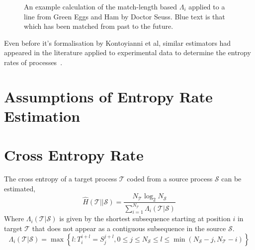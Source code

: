 \begin{figure}[hb]
	\caption{An example calculation of the match-length based $\Lambda_i$ applied to a line from Green Eggs and Ham by Doctor Seuss. {\color{blue} Blue text} is that which has been matched from past to the future. }
\end{figure}


Even before it's formalisation by Kontoyianni et al, similar estimators had appeared in the literature applied to experimental data to determine the entropy rates of processes~\cite{chenUsingDifficultyPrediction1993, chenFastPatternMatching1995, farachEntropyDNAAlgorithms1995, juolaWhatCanWe1997}.



\section{Assumptions of Entropy Rate Estimation}







\section{Cross Entropy Rate}



\begin{definition}
	The cross entropy of a {\color{target} target process} $\mathcal{T}$ coded from a {\color{source} source process} $\mathcal{S}$ can be estimated,
	\begin{equation}
	\hat{H}(\mathcal{T} || \mathcal{S})=\frac{N_{\mathcal{T}} \log _{2} N_{\mathcal{S}}}{\sum_{i=1}^{N_{\mathcal{T}}} \Lambda_{i}(\mathcal{T}| \mathcal{S})}
	\end{equation}
	Where $\Lambda_{i}(\mathcal{T}| \mathcal{S})$ is given by the shortest subsequence starting at position $i$ in {\color{target}target} $\mathcal{T}$ that does not appear as a contiguous subsequence in the {\color{source}source} $\mathcal{S}$.
	\begin{equation}
	\Lambda_{i}(\mathcal{T}| \mathcal{S}) = \max \left\{l: T_i^{i+l}=S_{j}^{j+l}, 0 \leq j \leq N_{\mathcal{S}} \leq l \leq \min( N_{\mathcal{S}}- j , N_{\mathcal{T}}- i )\right\}
	\end{equation}
\end{definition}


